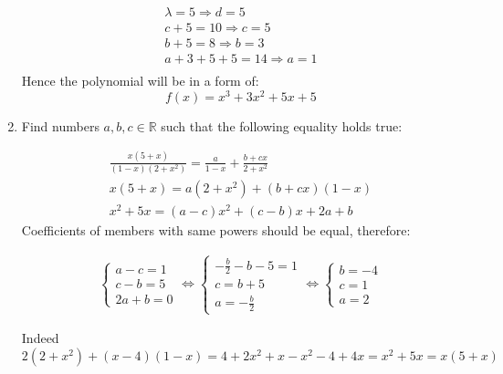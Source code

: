 \documentclass{article}
\begin{document}
\begin{enumerate}
\begin{align*}
\lambda = 5 \Rightarrow d = 5\\
c + 5 = 10 \Rightarrow c = 5\\
b + 5 = 8 \Rightarrow b = 3\\
a + 3 + 5 + 5 = 14 \Rightarrow a = 1\\
\end{align*}
Hence the polynomial will be in a form of:
\[f(x) = x^3 + 3x^2 + 5x + 5\]



\item Find numbers $a, b, c \in \mathbb{R}$ such that the following equality holds true:

\begin{align*}
\frac{x(5+x)}{(1-x)(2+x^2)} = \frac{a}{1-x} + \frac{b + cx}{2+x^2}\\
x(5+x) = a(2+x^2) + (b + cx)(1 - x)\\
x^2 + 5x = (a - c)x^2 + (c - b)x + 2a + b
\end{align*}
Coefficients of members with same powers should be equal, therefore:

\begin{align*}
\begin{cases}
a - c = 1\\
c - b = 5\\
2a + b = 0
\end{cases} 
\iff
\begin{cases}
-\frac{b}{2} - b - 5 = 1\\
c = b + 5\\
a = -\frac{b}{2}
\end{cases}
\iff
\begin{cases}
b = -4\\
c = 1\\
a = 2
\end{cases}
\end{align*}

Indeed $2(2 + x^2) + (x - 4)(1 - x) = 4 + 2x^2 + x - x^2 - 4 + 4x = x^2 + 5x = x(5+x)$

\end{enumerate}
\end{document}
